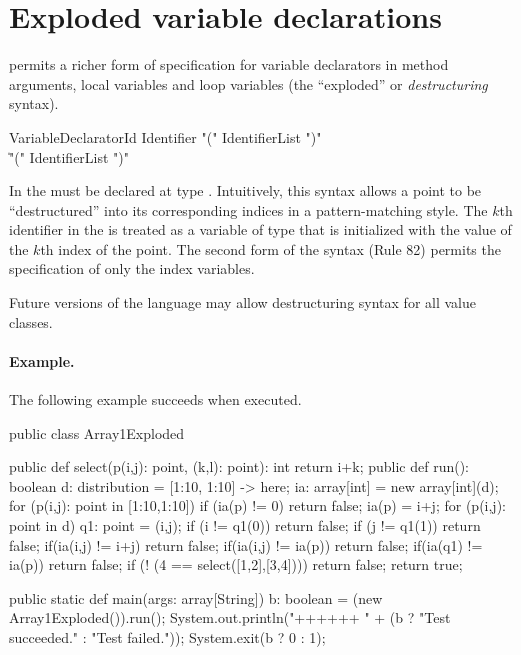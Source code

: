 \section{Exploded variable declarations}\label{exploded-syntax}

\Xten{} permits a richer form of specification for variable
declarators in method arguments, local variables and loop variables
(the ``exploded'' or {\em destructuring} syntax).
\begin{grammar}
VariableDeclaratorId \:
           Identifier \xcd"(" IdentifierList \xcd")" \\
           \| \xcd"(" IdentifierList \xcd")" \\
\end{grammar}
In \XtenCurrVer{} the  must be declared at
type . Intuitively, this syntax allows a
point to be ``destructured'' into its corresponding  
indices in a pattern-matching style.
The $k$th identifier in the  is treated as a  variable of type 
that is initialized with the value of the $k$th index of the point. 
The second form of the syntax (Rule 82) permits the specification of only
the index variables.

Future versions of the language may allow destructuring syntax for all
value classes.

\paragraph{Example.}
The following example succeeds when executed.
\begin{xten}
public class Array1Exploded {
  public def select(p(i,j): point, (k,l): point): int {
      return i+k;
  }
  public def run(): boolean {
    d: distribution = [1:10, 1:10] -> here;
    ia: array[int] = new array[int](d);
    for (p(i,j): point in [1:10,1:10]) {
        if (ia(p) != 0) return false;
        ia(p) = i+j;
    }
    for (p(i,j): point in d) {
      q1: point = (i,j);
      if (i != q1(0)) return false;
      if (j != q1(1)) return false;
      if(ia(i,j) != i+j) return false;
      if(ia(i,j) != ia(p)) return false;
      if(ia(q1)  != ia(p)) return false;
    }
    if (! (4 == select([1,2],[3,4]))) return false;
    return true;
  }
        
  public static def main(args: array[String]) {
     b: boolean = (new Array1Exploded()).run();
     System.out.println("++++++ "
                        + (b ? "Test succeeded."
                             : "Test failed."));
     System.exit(b ? 0 : 1);
  }
}
\end{xten}



